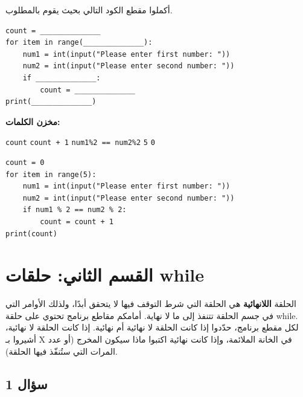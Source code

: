 \documentclass[14pt]{extarticle}
\begin{document}
أكملوا مقطع الكود التالي بحيث يقوم بالمطلوب.

\begin{boxCode}
\begin{english}
\begin{verbatim}
count = ______________
for item in range(______________):
    num1 = int(input("Please enter first number: "))
    num2 = int(input("Please enter second number: "))
    if ______________:
        count = ______________
print(______________)
\end{verbatim}
\end{english}
\end{boxCode}

\textbf{مخزن الكلمات:}
\begin{center}
\begin{english}
\texttt{count} \quad \texttt{count + 1} \quad \texttt{num1\%2 == num2\%2} \quad \texttt{5} \quad \texttt{0}
\end{english}
\end{center}

\ifwithsols
\begin{boxSolution}
\begin{english}
\begin{verbatim}
count = 0
for item in range(5):
    num1 = int(input("Please enter first number: "))
    num2 = int(input("Please enter second number: "))
    if num1 % 2 == num2 % 2:
        count = count + 1
print(count)
\end{verbatim}
\end{english}
\end{boxSolution}
\fi

\clearpage

\section*{القسم الثاني: حلقات \textenglish{while}}

الحلقة \textbf{اللانهائية} هي الحلقة التي شرط التوقف فيها لا يتحقق أبدًا، ولذلك الأوامر التي في جسم الحلقة تتنفذ إلى ما لا نهاية. أمامكم مقاطع برنامج تحتوي على حلقة \textenglish{while}. لكل مقطع برنامج، حدّدوا إذا كانت الحلقة لا نهائية أم نهائية.
إذا كانت الحلقة لا نهائية، أشيروا بـ \textenglish{X} في الخانة الملائمة، وإذا كانت نهائية اكتبوا ماذا سيكون المخرج (أو عدد المرات التي ستُنفّذ فيها الحلقة).

\subsection*{سؤال 1}
\end{document}

